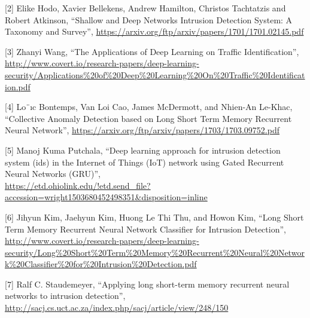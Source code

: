 \documentclass[a4paper]{article}
\begin{document}
[2] Elike Hodo, Xavier Bellekens, Andrew Hamilton, Christos Tachtatzis and Robert Atkinson, “Shallow and Deep Networks Intrusion Detection System: A Taxonomy and Survey”, \url{https://arxiv.org/ftp/arxiv/papers/1701/1701.02145.pdf}

[3] Zhanyi Wang, “The Applications of Deep Learning on Traffic Identification”, \url{http://www.covert.io/research-papers/deep-learning-security/Applications%20of%20Deep%20Learning%20On%20Traffic%20Identification.pdf}

[4] Lo¨ıc Bontemps, Van Loi Cao, James McDermott, and Nhien-An Le-Khac, “Collective Anomaly Detection based on Long Short Term Memory Recurrent Neural Network”, \url{https://arxiv.org/ftp/arxiv/papers/1703/1703.09752.pdf}

[5] Manoj Kuma Putchala, “Deep learning approach for intrusion detection system (ids) in
the Internet of Things (IoT) network using Gated Recurrent Neural Networks (GRU)”,\\ \url{https://etd.ohiolink.edu/!etd.send_file?accession=wright1503680452498351&disposition=inline}

[6] Jihyun Kim, Jaehyun Kim, Huong Le Thi Thu, and Howon Kim, “Long Short Term Memory Recurrent Neural Network Classifier for Intrusion Detection”, \url{http://www.covert.io/research-papers/deep-learning-security/Long%20Short%20Term%20Memory%20Recurrent%20Neural%20Network%20Classifier%20for%20Intrusion%20Detection.pdf}

[7] Ralf C. Staudemeyer, “Applying long short-term memory recurrent neural networks to intrusion detection”, \url{http://sacj.cs.uct.ac.za/index.php/sacj/article/view/248/150}
\end{document}
